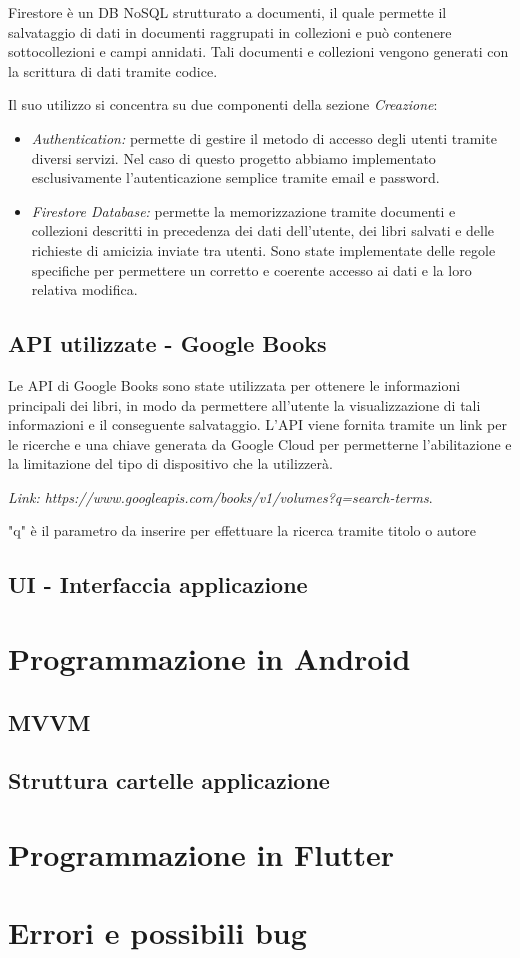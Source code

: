 \documentclass{article}
\begin{document}
Firestore è un DB NoSQL strutturato a documenti, il quale permette il salvataggio di dati in documenti raggrupati in collezioni e può contenere sottocollezioni e campi annidati. Tali documenti e collezioni vengono generati con la scrittura di dati tramite codice.

Il suo utilizzo si concentra su due componenti della sezione \textit{Creazione}:
\begin{itemize}
  \item \textit{Authentication:} permette di gestire il metodo di accesso degli utenti tramite diversi servizi. Nel caso di questo progetto abbiamo implementato esclusivamente l'autenticazione semplice tramite email e password. 
  \item \textit{Firestore Database:} permette la memorizzazione tramite documenti e collezioni descritti in precedenza dei dati dell'utente, dei libri salvati e delle richieste di amicizia inviate tra utenti. Sono state implementate delle regole specifiche 
  per permettere un corretto e coerente accesso ai dati e la loro relativa modifica.
\end{itemize}


\subsection{API utilizzate - Google Books}
Le API di Google Books sono state utilizzata per ottenere le informazioni principali dei libri, in modo da permettere
all'utente la visualizzazione di tali informazioni e il conseguente salvataggio. L'API viene fornita tramite un link 
per le ricerche e una chiave generata da Google Cloud per permetterne l'abilitazione e la limitazione del tipo di dispositivo che la utilizzerà.

\textit{Link:  https://www.googleapis.com/books/v1/volumes?q=search-terms}.

"q" è il parametro da inserire per effettuare la ricerca tramite titolo o autore
\subsection{UI - Interfaccia applicazione}

\section{Programmazione in Android}

\subsection{MVVM}

\subsection{Struttura cartelle applicazione}

\section{Programmazione in Flutter}

\section{Errori e possibili bug}
\end{document}
